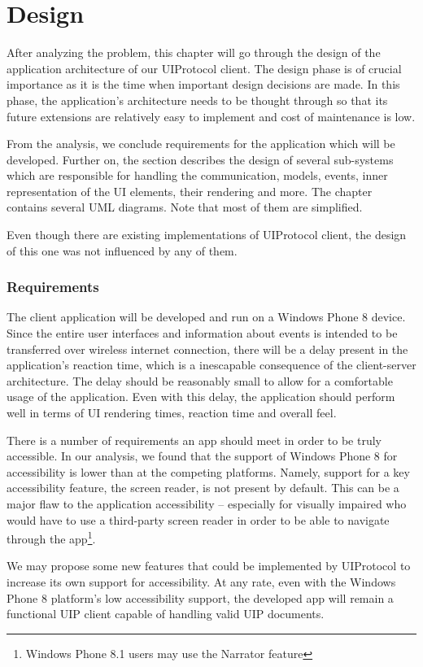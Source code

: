 \chapter{Design}
After analyzing the problem, this chapter will go through the design of the application architecture of our UIProtocol client. The design phase is of crucial importance as it is the time when important design decisions are made. In this phase, the application's architecture needs to be thought through so that its future extensions are relatively easy to implement and cost of maintenance is low.

From the analysis, we conclude requirements for the application which will be developed. Further on, the section describes the design of several sub-systems which are responsible for handling the communication, models, events, inner representation of the UI elements, their rendering and more. The chapter contains several UML diagrams. Note that most of them are simplified.

Even though there are existing implementations of UIProtocol client, the design of this one was not influenced by any of them.

\subsection{Requirements}
The client application will be developed and run on a Windows Phone 8 device. Since the entire user interfaces and information about events is intended to be transferred over wireless internet connection, there will be a delay present in the application's reaction time, which is a inescapable consequence of the client-server architecture. The delay should be reasonably small to allow for a comfortable usage of the application. Even with this delay, the application should perform well in terms of UI rendering times, reaction time and overall feel.

There is a number of requirements an app should meet in order to be truly accessible. In our analysis, we found that the support of Windows Phone 8 for accessibility is lower than at the competing platforms. Namely, support for a key accessibility feature, the screen reader, is not present by default. This can be a major flaw to the application accessibility – especially for visually impaired who would have to use a third-party screen reader in order to be able to navigate through the app\footnote{Windows Phone 8.1 users may use the Narrator feature}.

We may propose some new features that could be implemented by UIProtocol to increase its own support for accessibility. At any rate, even with the Windows Phone 8 platform's low accessibility support, the developed app will remain a functional UIP client capable of handling valid UIP documents.


